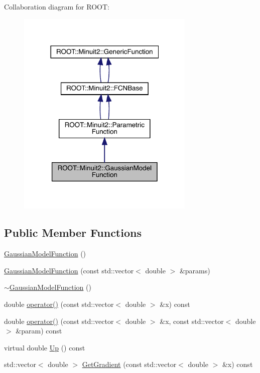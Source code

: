 Collaboration diagram for R\+O\+OT\+:\nopagebreak
\begin{figure}[H]
\begin{center}
\leavevmode
\includegraphics[width=240pt]{da/d35/classROOT_1_1Minuit2_1_1GaussianModelFunction__coll__graph}
\end{center}
\end{figure}
\subsection*{Public Member Functions}
\begin{DoxyCompactItemize}
\item 
\mbox{\hyperlink{classROOT_1_1Minuit2_1_1GaussianModelFunction_aebecd6f3f9e7b6e7d6787f38cfc84cdc}{Gaussian\+Model\+Function}} ()
\item 
\mbox{\hyperlink{classROOT_1_1Minuit2_1_1GaussianModelFunction_ab766a76f32f2369508bde703519cc049}{Gaussian\+Model\+Function}} (const std\+::vector$<$ double $>$ \&params)
\item 
\mbox{\hyperlink{classROOT_1_1Minuit2_1_1GaussianModelFunction_abc4e84ccbc432e7706d8407c1d2efd6a}{$\sim$\+Gaussian\+Model\+Function}} ()
\item 
double \mbox{\hyperlink{classROOT_1_1Minuit2_1_1GaussianModelFunction_af4102c5eecd496d63c5592f7519248ce}{operator()}} (const std\+::vector$<$ double $>$ \&x) const
\item 
double \mbox{\hyperlink{classROOT_1_1Minuit2_1_1GaussianModelFunction_ab74ced8f50ef3831c8142de54877e726}{operator()}} (const std\+::vector$<$ double $>$ \&x, const std\+::vector$<$ double $>$ \&param) const
\item 
virtual double \mbox{\hyperlink{classROOT_1_1Minuit2_1_1GaussianModelFunction_ae99a5c50055e4563a2252ba8ceb19d20}{Up}} () const
\item 
std\+::vector$<$ double $>$ \mbox{\hyperlink{classROOT_1_1Minuit2_1_1GaussianModelFunction_ac81a3c5531a291b8a9c3af533de07195}{Get\+Gradient}} (const std\+::vector$<$ double $>$ \&x) const
\end{DoxyCompactItemize}
